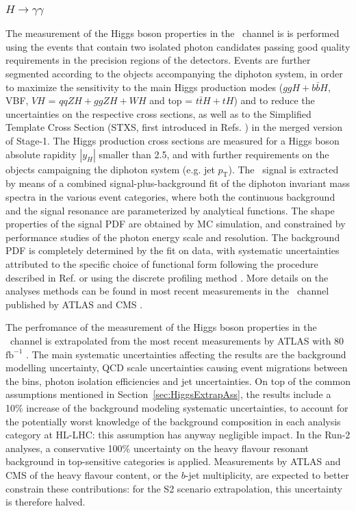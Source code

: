 \subsubsection{$H \to \gamma\gamma$}
\label{sec:Hgammagamma}

The measurement of the Higgs boson properties in the \Hyy\ channel is is performed using the events that contain two isolated photon candidates passing good quality requirements in the precision regions of the detectors. Events are further segmented according to the objects accompanying the diphoton system, in order to maximize the sensitivity to the main Higgs production modes ($ggH+b\bar{b}H$, VBF, $VH$ = $qqZH+ggZH+WH$ and top = $t\bar{t}H+tH$) and to reduce the uncertainties on the respective cross sections, as well as to the Simplified Template Cross Section (STXS, first introduced in Refs. \cite{deFlorian:2016spz,Badger:2016bpw}) in the merged version of Stage-1.
The Higgs production cross sections are measured for a Higgs boson absolute rapidity $|y_H|$ smaller than 2.5, and with further requirements on the objects campaigning the diphoton system (e.g. jet $p_\mathrm{T}$).
The \Hyy\ signal is extracted by means of a combined signal-plus-background fit of the diphoton invariant mass spectra in the various event categories, where both the continuous background and the signal resonance are parameterized by analytical functions. The shape properties of the signal PDF are obtained by MC simulation, and constrained by performance studies of the photon energy scale and resolution. The background PDF is completely determined by the fit on data, with systematic uncertainties attributed to the specific choice of functional form following the procedure described in Ref. \cite{Aad:2012tfa} or using the discrete profiling method \cite{Dauncey:2014xga}. More details on the analyses methods can be found in most recent measurements in the \Hyy\ channel published by ATLAS \cite{ATLAS:2018uso} and CMS \cite{CMS:2018???}. 

The perfromance of the measurement of the Higgs boson properties in the \Hyy\ channel is extrapolated from the most recent measurements by ATLAS with 80\,$\mathrm{fb}^{-1}$ \cite{ATLAS:2018uso}. The main systematic uncertainties affecting the results are the background modelling uncertainty, QCD scale uncertainties causing event migrations between the bins, photon isolation efficiencies and jet uncertainties.
%
On top of the common assumptions mentioned in Section~\ref{sec:HiggsExtrapAss}, the %
results include a 10\% increase of the background modeling systematic uncertainties, to account for the potentially worst knowledge of the background composition in each analysis category at HL-LHC: this assumption has anyway negligible impact.
%
In the Run-2 analyses, a conservative 100\% uncertainty on the heavy flavour resonant background in top-sensitive categories is applied. Measurements by ATLAS and CMS of the heavy flavour content, or the $b$-jet multiplicity, are expected to better constrain these contributions: for the S2 scenario extrapolation, this uncertainty is therefore halved.

